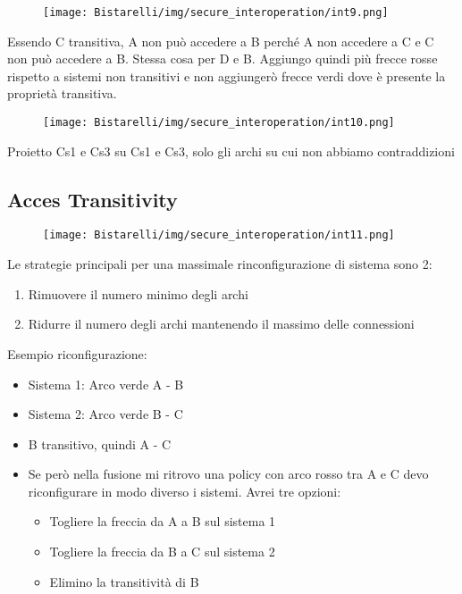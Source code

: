 \begin{figure}[H]
	\centering
    \texttt{[image: Bistarelli/img/secure\_interoperation/int9.png]}
\end{figure}

Essendo C transitiva, A non può accedere a B perché A non accedere a C e C non può accedere a B. Stessa
cosa per D e B. Aggiungo quindi più frecce rosse rispetto a sistemi non transitivi e non aggiungerò frecce verdi
dove è presente la proprietà transitiva.

\begin{figure}[H]
	\centering
    \texttt{[image: Bistarelli/img/secure\_interoperation/int10.png]}
\end{figure}

Proietto Cs1 e Cs3 su  Cs1 e Cs3, solo gli archi su cui non abbiamo contraddizioni 
\subsection{Acces Transitivity}

\begin{figure}[H]
	\centering
    \texttt{[image: Bistarelli/img/secure\_interoperation/int11.png]}
\end{figure}

Le strategie principali per una massimale rinconfigurazione di sistema sono 2:
\begin{enumerate}
    \item Rimuovere il numero minimo degli archi
    
    \item Ridurre il numero degli archi mantenendo il massimo delle connessioni
\end{enumerate}
Esempio riconfigurazione:
\begin{itemize}
    \item Sistema 1: Arco verde A - B
    
    \item Sistema 2: Arco verde B - C
    
    \item B transitivo, quindi A - C
    
    \item  Se però nella fusione mi ritrovo una policy con arco rosso tra A e C devo riconfigurare in modo diverso i sistemi. Avrei tre opzioni:
    
    \begin{itemize}
        \item Togliere la freccia da A a B sul sistema 1
        
        \item Togliere la freccia da B a C sul sistema 2
        
        \item Elimino la transitività di B
    \end{itemize}
\end{itemize}

